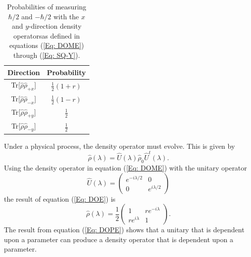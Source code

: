 \documentclass[twocolumn]{article}
\begin{document}
\begin{table}[ht]
    \centering
    \begin{tabular}{|c|c|}
         \hline Direction & Probability \\
         \hline Tr[$\hat{\rho}\hat{\rho}_{+x}$] & $\frac{1}{2}(1+r)$ \\
         \hline Tr[$\hat{\rho}\hat{\rho}_{-x}$] & $\frac{1}{2}(1-r)$ \\
         \hline Tr[$\hat{\rho}\hat{\rho}_{+y}$] & $\frac{1}{2}$ \\
         \hline Tr[$\hat{\rho}\hat{\rho}_{-y}$] & $\frac{1}{2}$ \\
         \hline
    \end{tabular}
    \caption{\footnotesize{Probabilities of measuring $\hbar/2$ and $-\hbar/2$ with the $x$ and $y$-direction density operatorsas defined in equations (\ref{Eq: DOME}) through (\ref{Eq: SQ-Y}).}}
    \label{Tab: SQC}
\end{table}
\par \noindent
Under a physical process, the density operator must evolve. This is given by
\begin{equation} \label{Eq: DOE}
\hat{\rho}(\lambda)=\hat{U}(\lambda)\hat{\rho}_0\hat{U}^{t}(\lambda).
\end{equation}
Using the density operator in equation (\ref{Eq: DOME}) with the unitary operator
\begin{equation} \label{Eq: DOUM} 
\hat{U}(\lambda)=
\begin{pmatrix}
e^{-i\lambda/2} & 0 \\
0 & e^{i\lambda/2}
\end{pmatrix}
\end{equation}
the result of equation (\ref{Eq: DOE}) is
\begin{equation} \label{Eq: DOPE}
\hat{\rho}(\lambda)=\frac{1}{2}
\begin{pmatrix}
1 & re^{-i\lambda} \\
re^{i\lambda} & 1
\end{pmatrix}.
\end{equation}
The result from equation (\ref{Eq: DOPE}) shows that a unitary that is dependent upon a parameter can produce a density operator that is dependent upon a parameter.
\end{document}
